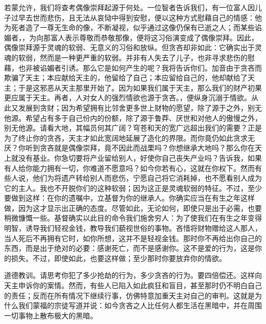 若蒙允许，我们将查考偶像崇拜起源于何处。一位智者告诉我们，有一位富人因儿子过早去世而悲伤，且无法从哀恸中得到安慰，便以这种方式慰藉自己的情感：他为死者造了一尊无生命的像，不断凝视，似乎通过这像仍保有已逝之人；而某些谄媚者，，为向那富人表示尊敬而恭敬那像，便将这习俗演变成了偶像崇拜。因此，偶像崇拜源于灵魂的软弱、无意义的习俗和放纵。但贪吝却非如此：它确实出于灵魂的软弱，然而是一种更严重的软弱。并非有人失去了儿子，也非寻求悲伤的慰藉，也非被谄媚者引诱。那么它是如何产生的呢？我将告诉你们。加音由于贪吝而欺骗了天主；本应献给天主的，他留给了自己；本应留给自己的，他却献给了天主；于是这邪恶从天主那里开始了。因为如果我们属于天主，那么我们的财产初果更应属于天主。再者，人对女人的强烈情欲也源于贪吝。，便纵身沉溺于情欲。从此又发展到贪财；因为希望拥有比邻舍更多世上财物的愿望，除了源于之外，别无他源。希望占有多于自己份内的份额，除了源于鲁莽、厌世和对他人的傲慢之外，别无他源。请看大地，其幅员何其广阔？穹苍和天的宽广远超出我们的需要？正是为了终止你的贪吝，天主才如此宽阔地延展了造化的界限。而你竟仍如此贪求无厌？你听到贪吝就是偶像崇拜，竟不因此而战栗吗？你想继承大地吗？那么你在天上就没有基业。你急切要将产业留给别人，好使你自己丧失产业吗？告诉我，如果有人给你能力拥有一切，你难道不愿意吗？如今你若有心，这就在你权下。然而有些人说，他们为将遗产转给别人而悲伤，宁愿自己将它消耗掉，也不愿看别人成为它的主人。我也不开脱你们的这种软弱；因为这正是灵魂软弱的特征。不过，至少要做到这样：在你的遗嘱中，立基督为你的继承人。你确实应当在有生之年这样做，因为这才显示出正确的态度。尽管如此，无论如何，即使只是出于必需，也要稍微慷慨一些。基督确实以此目的命令我们施舍穷人：为了使我们在有生之年变得明智，诱导我们轻视金钱，教导我们藐视世俗的事物。吝惜将财物赠给这人那人，当人死后不再拥有它时，如你所想，这并不是轻视金钱。那时你不再给出你自己的东西，而是出于绝对的必要：感谢死亡，而不是感谢你。这不是爱的行为，这是你的损失。不过，即使如此，也要这样做；至少那时你要放弃你的情欲。\par

道德教训。请思考你犯了多少抢劫的行为，多少贪吝的行为。要四倍偿还。这样向天主申诉你的案情。然而，有些人已陷入如此疯狂和盲目，甚至那时仍不明白自己的责任；反而在所有情况下继续行事，仿佛特意加重天主对自己的审判。这就是为什么我们蒙福的宗徒写道并说：如今贪吝之人比任何人都生活在黑暗中，并在周围一切事物上散布极大的黑暗。\par


